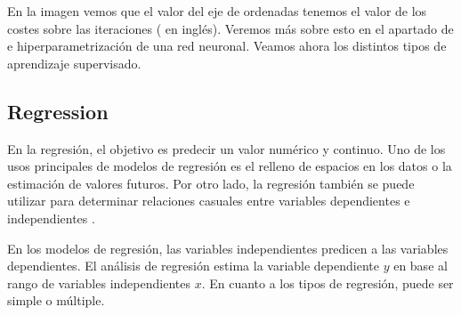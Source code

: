 
En la imagen vemos que el valor del eje de ordenadas tenemos el valor de los costes sobre las iteraciones ( en inglés). Veremos más sobre esto en el apartado de  e hiperparametrización de una red neuronal. Veamos ahora los distintos tipos de aprendizaje supervisado.

\subsection{Regression}

En la regresión, el objetivo es predecir un valor numérico y continuo. Uno de los usos principales de modelos de regresión es el relleno de espacios en los datos o la estimación de valores futuros. Por otro lado, la regresión también se puede utilizar para determinar relaciones casuales entre variables dependientes e independientes .

En los modelos de regresión, las variables independientes predicen a las variables dependientes. El análisis de regresión estima la variable dependiente $y$ en base al rango de variables independientes $x$. En cuanto a los tipos de regresión, puede ser simple o múltiple.

